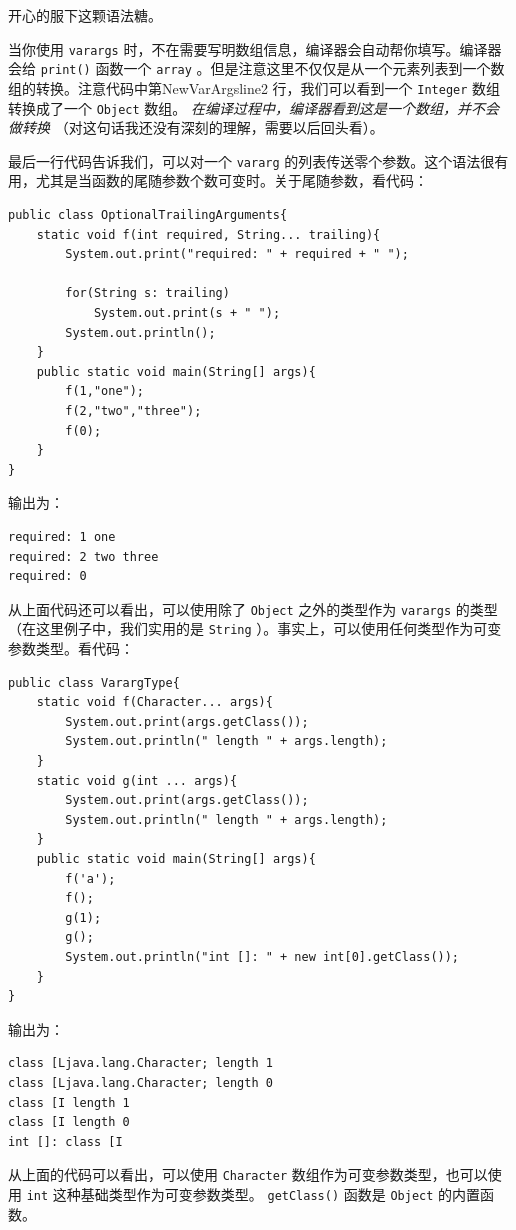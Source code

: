 \documentclass[10pt,a4paper,UTF8]{article}
\begin{document}
开心的服下这颗语法糖。

当你使用 \texttt{varargs} 时，不在需要写明数组信息，编译器会自动帮你填写。编译器会给 \texttt{print()} 函数一个 \texttt{array} 。但是注意这里不仅仅是从一个元素列表到一个数组的转换。注意代码中第NewVarArgsline2 行，我们可以看到一个 \texttt{Integer} 数组转换成了一个 \texttt{Object} 数组。 \emph{在编译过程中，编译器看到这是一个数组，并不会做转换}  （对这句话我还没有深刻的理解，需要以后回头看）。

最后一行代码告诉我们，可以对一个 \texttt{vararg} 的列表传送零个参数。这个语法很有用，尤其是当函数的尾随参数个数可变时。关于尾随参数，看代码：
\lstset{language=C,label= ,caption= ,captionpos=b,firstnumber=1,numbers=left}
\begin{lstlisting}
public class OptionalTrailingArguments{
    static void f(int required, String... trailing){
        System.out.print("required: " + required + " ");

        for(String s: trailing)
            System.out.print(s + " ");
        System.out.println();
    }
    public static void main(String[] args){
        f(1,"one");
        f(2,"two","three");
        f(0);
    }
}
\end{lstlisting}
输出为：
\begin{verbatim}
required: 1 one 
required: 2 two three 
required: 0
\end{verbatim}

从上面代码还可以看出，可以使用除了 \texttt{Object} 之外的类型作为 \texttt{varargs} 的类型（在这里例子中，我们实用的是 \texttt{String} ）。事实上，可以使用任何类型作为可变参数类型。看代码：
\lstset{language=C,label= ,caption= ,captionpos=b,firstnumber=1,numbers=left}
\begin{lstlisting}
public class VarargType{
    static void f(Character... args){
        System.out.print(args.getClass());
        System.out.println(" length " + args.length);
    }
    static void g(int ... args){
        System.out.print(args.getClass());
        System.out.println(" length " + args.length);
    }
    public static void main(String[] args){
        f('a');
        f();
        g(1);
        g();
        System.out.println("int []: " + new int[0].getClass());
    }
}
\end{lstlisting}
输出为：
\begin{verbatim}
class [Ljava.lang.Character; length 1
class [Ljava.lang.Character; length 0
class [I length 1
class [I length 0
int []: class [I
\end{verbatim}

从上面的代码可以看出，可以使用 \texttt{Character} 数组作为可变参数类型，也可以使用 \texttt{int} 这种基础类型作为可变参数类型。 \texttt{getClass()} 函数是 \texttt{Object} 的内置函数。 
\end{document}
